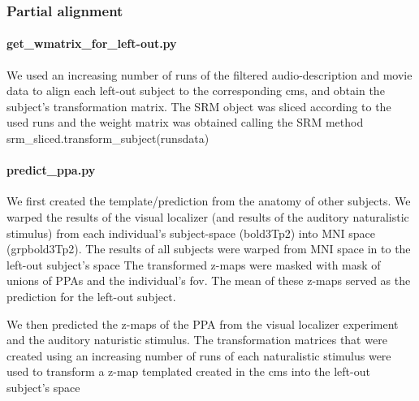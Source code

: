 \subsubsection{Partial alignment}


\paragraph{get\_wmatrix\_for\_left-out.py}

We used an increasing number of runs of the filtered audio-description and movie
data to align each left-out subject to the corresponding \ac{cms}, and obtain
the subject's transformation matrix.
%
The SRM object was sliced according to the used runs and the weight matrix was
obtained calling the SRM method srm\_sliced.transform\_subject(runsdata)


\paragraph{predict\_ppa.py}

We first created the template/prediction from the anatomy of other subjects.
%
We warped the results of the visual localizer (and results of the auditory
naturalistic stimulus) from each individual's subject-space (bold3Tp2) into MNI
space (grpbold3Tp2).
The results of all subjects were warped from MNI space in to the left-out
subject's space
The transformed z-maps were masked with mask of unions of PPAs and the
individual's \ac{fov}.
%
The mean of these z-maps served as the prediction for the left-out subject.

We then predicted the z-maps of the PPA from the visual localizer experiment and
the auditory naturistic stimulus.
%
The transformation matrices that were created using an increasing number of runs
of each naturalistic stimulus were used to transform a z-map templated created
in the \ac{cms} into the left-out subject's space

